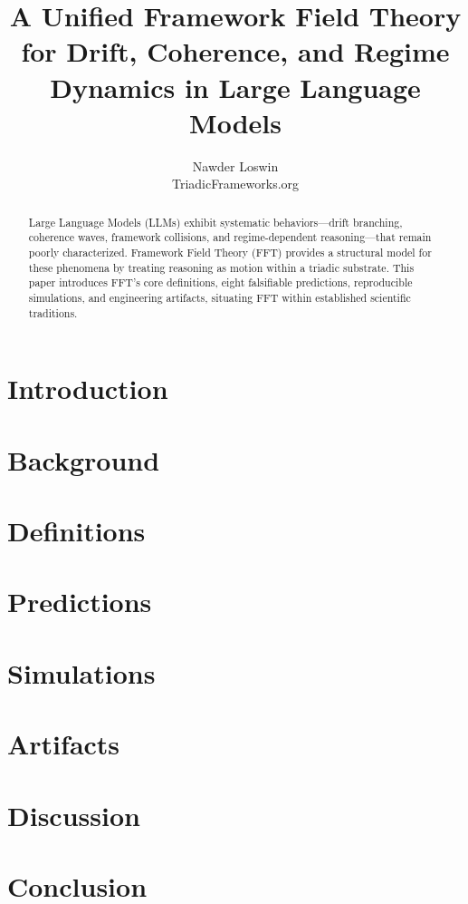 \documentclass[10pt]{article}
\title{\textbf{A Unified Framework Field Theory for Drift, Coherence, and Regime Dynamics in Large Language Models}}
\author{Nawder Loswin \\ TriadicFrameworks.org}
\date{}
\begin{document}
\maketitle

\begin{abstract}
Large Language Models (LLMs) exhibit systematic behaviors---drift branching, coherence waves, framework collisions, and regime-dependent reasoning---that remain poorly characterized. Framework Field Theory (FFT) provides a structural model for these phenomena by treating reasoning as motion within a triadic substrate. This paper introduces FFT's core definitions, eight falsifiable predictions, reproducible simulations, and engineering artifacts, situating FFT within established scientific traditions.
\end{abstract}

\section{Introduction}

\section{Background}

\section{Definitions}

\section{Predictions}

\section{Simulations}

\section{Artifacts}

\section{Discussion}

\section{Conclusion}
\end{document}
